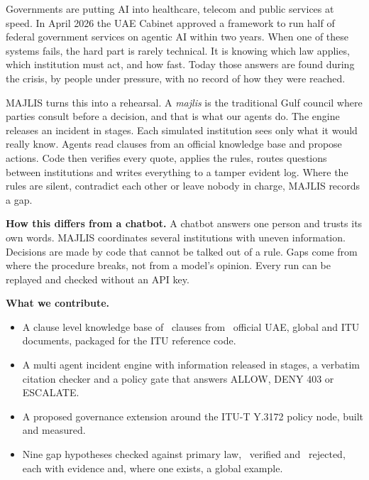 \documentclass[10pt,twocolumn]{article}
\begin{document}
Governments are putting AI into healthcare, telecom and public services at speed. In April 2026 the UAE Cabinet approved a framework to run half of federal government services on agentic AI within two years. When one of these systems fails, the hard part is rarely technical. It is knowing which law applies, which institution must act, and how fast. Today those answers are found during the crisis, by people under pressure, with no record of how they were reached.

MAJLIS turns this into a rehearsal. A \emph{majlis} is the traditional Gulf council where parties consult before a decision, and that is what our agents do. The engine releases an incident in stages. Each simulated institution sees only what it would really know. Agents read clauses from an official knowledge base and propose actions. Code then verifies every quote, applies the rules, routes questions between institutions and writes everything to a tamper evident log. Where the rules are silent, contradict each other or leave nobody in charge, MAJLIS records a gap.

\textbf{How this differs from a chatbot.} A chatbot answers one person and trusts its own words. MAJLIS coordinates several institutions with uneven information. Decisions are made by code that cannot be talked out of a rule. Gaps come from where the procedure breaks, not from a model's opinion. Every run can be replayed and checked without an API key.

\textbf{What we contribute.}
\begin{itemize}
\item A clause level knowledge base of \KBClauses\ clauses from \KBDocs\ official UAE, global and ITU documents, packaged for the ITU reference code.
\item A multi agent incident engine with information released in stages, a verbatim citation checker and a policy gate that answers ALLOW, DENY 403 or ESCALATE.
\item A proposed governance extension around the ITU\mbox{-}T Y.3172 policy node, built and measured.
\item Nine gap hypotheses checked against primary law, \NGapsVerified\ verified and \NGapsRejected\ rejected, each with evidence and, where one exists, a global example.
\end{itemize}
\end{document}
